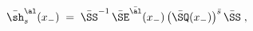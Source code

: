 \begin{equation}
\bar{\sh}_s^{\al}(x_-)\;=\;\bar{\SS}^{-1}\,
\bar{\SE}^{\bar{\al}}(x_-)\,
\big(\bar{\SQ}(x_-)\big)^{\bar{s}}\,\bar{\SS}
\;,\end{equation}

